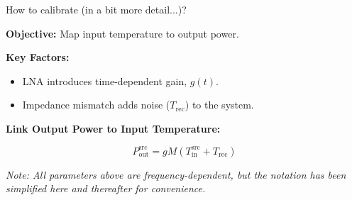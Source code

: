 \documentclass[aspectratio=169]{beamer}
\begin{document}
\begin{frame}{\small{How to calibrate (in a bit more detail...)?}}
	\vspace{-0.5cm}
	\begin{flushleft}
		\textbf{Objective:} Map input temperature to output power.
		\vspace{0.2cm}

		\textbf{Key Factors:}
		\begin{itemize}
			\item LNA introduces time-dependent gain, $g(t)$.
			\item Impedance mismatch adds noise ($T_{\text{rec}}$) to the system.
		\end{itemize}

		\vspace{0.2cm}
		\textbf{Link Output Power to Input Temperature:}
	\end{flushleft}

	{
	\begin{equation}
		P_{\text{out}}^{\text{src}} = g M \left( T_{\text{in}}^{\text{src}} + T_{\text{rec}} \right)
	\end{equation}
	}

	\vfill %

	\begin{footnotesize}
		\textit{Note: All parameters above are frequency-dependent, but the notation has been simplified here and thereafter for convenience.}
	\end{footnotesize}

\end{frame}
\end{document}
